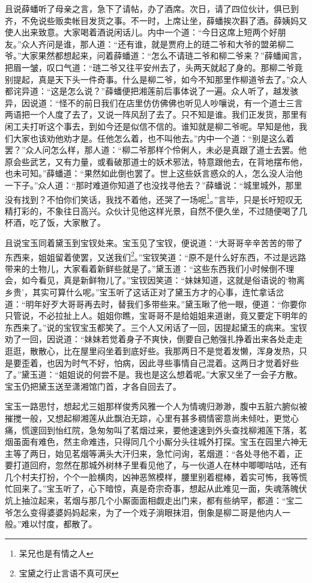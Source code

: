 \documentclass[12pt,oneside]{book}
\begin{document}
且说薛蟠听了母亲之言，急下了请帖，办了酒席。次日，请了四位伙计，俱已到齐，不免说些贩卖帐目发货之事。不一时，上席让坐，薛蟠挨次斟了酒。薛姨妈又使人出来致意。大家喝着酒说闲话儿。内中一个道：“今日这席上短两个好朋友。”众人齐问是谁，那人道：“还有谁，就是贾府上的琏二爷和大爷的盟弟柳二爷。”大家果然都想起来，问着薛蟠道：“怎么不请琏二爷和柳二爷来？”薛蟠闻言，把眉一皱，叹口气道：“琏二爷又往平安州去了，头两天就起了身的。那柳二爷竟别提起，真是天下头一件奇事。什么是柳二爷，如今不知那里作柳道爷去了。”众人都诧异道：“这是怎么说？”薛蟠便把湘莲前后事体说了一遍。众人听了，越发骇异，因说道：“怪不的前日我们在店里仿仿佛佛也听见人吵嚷说，有一个道士三言两语把一个人度了去了，又说一阵风刮了去了。只不知是谁。我们正发货，那里有闲工夫打听这个事去，到如今还是似信不信的。谁知就是柳二爷呢。早知是他，我们大家也该劝他劝才是。任他怎么着，也不叫他去。”内中一个道：“别是这么着罢？”众人问怎么样，那人道：“柳二爷那样个伶俐人，未必是真跟了道士去罢。他原会些武艺，又有力量，或看破那道士的妖术邪法，特意跟他去，在背地摆布他，也未可知。”薛蟠道：“果然如此倒也罢了。世上这些妖言惑众的人，怎么没人治他一下子。”众人道：“那时难道你知道了也没找寻他去？”薛蟠说：“城里城外，那里没有找到？不怕你们笑话，我找不着他，还哭了一场呢\footnote{呆兄也是有情之人}。”言毕，只是长吁短叹无精打彩的，不象往日高兴。众伙计见他这样光景，自然不便久坐，不过随便喝了几杯酒，吃了饭，大家散了。

且说宝玉同着黛玉到宝钗处来。宝玉见了宝钗，便说道：“大哥哥辛辛苦苦的带了东西来，姐姐留着使罢，又送我们\footnote{宝黛之行止言语不真可厌}。”宝钗笑道：“原不是什么好东西，不过是远路带来的土物儿，大家看着新鲜些就是了。”黛玉道：“这些东西我们小时候倒不理会，如今看见，真是新鲜物儿了。”宝钗因笑道：“妹妹知道，这就是俗语说的‘物离乡贵’，其实可算什么呢。”宝玉听了这话正对了黛玉方才的心事，连忙拿话岔道：“明年好歹大哥哥再去时，替我们多带些来。”黛玉瞅了他一眼，便道：“你要你只管说，不必拉扯上人。姐姐你瞧，宝哥哥不是给姐姐来道谢，竟又要定下明年的东西来了。”说的宝钗宝玉都笑了。三个人又闲话了一回，因提起黛玉的病来。宝钗劝了一回，因说道：“妹妹若觉着身子不爽快，倒要自己勉强扎挣着出来各处走走逛逛，散散心，比在屋里闷坐着到底好些。我那两日不是觉着发懒，浑身发热，只是要歪着，也因为时气不好，怕病，因此寻些事情自己混着。这两日才觉着好些了。”黛玉道：“姐姐说的何尝不是。我也是这么想着呢。”大家又坐了一会子方散。宝玉仍把黛玉送至潇湘馆门首，才各自回去了。

宝玉一路思忖，想起尤三姐那样俊秀风雅一个人为情魂归渺渺，腹中五脏六腑似被摧搅一般，又想起柳湘莲从此飘泊无踪，心里有甚多稠情密意尚未倾吐，更觉心痛，慌邃回到怡红院，急匆匆叫了茗烟过来，要他速速到外头查找柳湘莲下落，茗烟虽面有难色，然主命难违，只得同几个小厮分头往城外打探。宝玉在园里六神无主等了两日，始见茗烟等满头大汗归来，急忙问询，茗烟道：“各处寻他不着，正要打道回府，忽然在那城外树林子里看见他了，与一伙道人在林中唧唧咕咕，还有几个村夫打扮，个个一脸横肉，凶神恶煞模样，腰里别着棍棒，着实可怖，我等慌忙回来了。”宝玉听了，心下暗惊，真是奇宗奇事，想起从此难见一面，失魂落魄伏炕上抽泣起来，茗烟与那几个小厮面面相觑走出门来，都有些纳罕，都道：“宝二爷怎么变得婆婆妈妈起来，为了一个戏子淌眼抹泪，倒象是柳二哥是他内人一般。”难以忖度，都散了。
\end{document}
